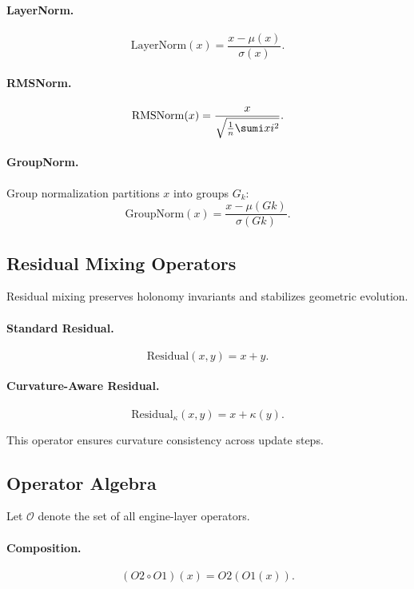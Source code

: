 \paragraph{LayerNorm.}
\[
\mathrm{LayerNorm}(x) = \frac{x - \mu(x)}{\sigma(x)}.
\]

\paragraph{RMSNorm.}
\[
\mathrm{RMSNorm}(x) = \frac{x}{\sqrt{\frac{1}{n}\sumi xi^2}}.
\]

\paragraph{GroupNorm.}
Group normalization partitions $x$ into groups $G_k$:
\[
\mathrm{GroupNorm}(x) = \frac{x - \mu(Gk)}{\sigma(Gk)}.
\]

\subsection{Residual Mixing Operators}

Residual mixing preserves holonomy invariants and stabilizes geometric evolution.

\paragraph{Standard Residual.}
\[
\mathrm{Residual}(x, y) = x + y.
\]

\paragraph{Curvature-Aware Residual.}
\[
\mathrm{Residual}_{\kappa}(x, y) = x + \kappa(y).
\]

This operator ensures curvature consistency across update steps.

\subsection{Operator Algebra}

Let $\mathcal{O}$ denote the set of all engine-layer operators.

\paragraph{Composition.}
\[
(O2 \circ O1)(x) = O2(O1(x)).
\]

